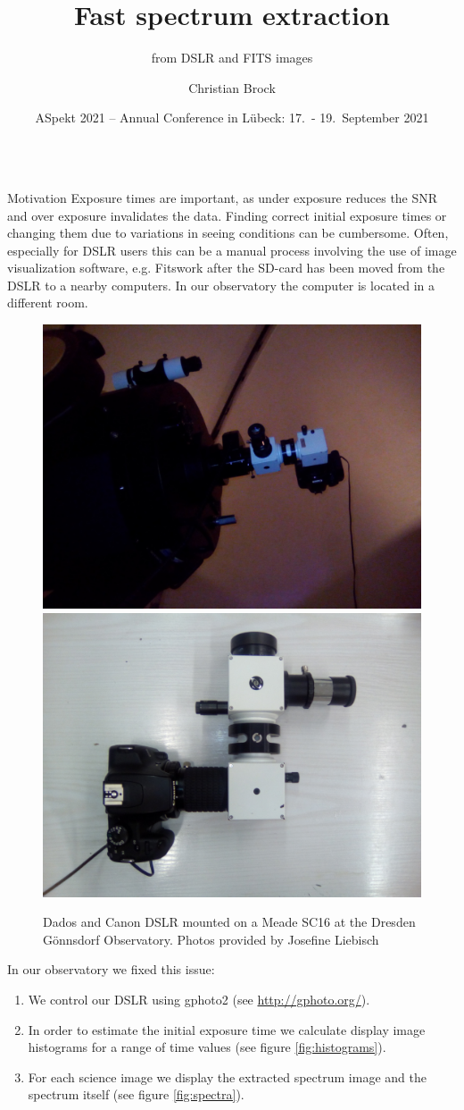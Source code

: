 \documentclass[final,t]{beamer}
\title[]{Fast spectrum extraction}
\subtitle{from DSLR and FITS images}
\author[]{Christian Brock}
\institute[]{Dresden Gönnsdorf Observatory}
\date{ASpekt 2021 -- Annual Conference in Lübeck: 17.\ - 19.\ September 2021}
\begin{document}
	
	\begin{frame}
		\maketitle
		
		\begin{columns}[t]
			\begin{column}{.32\linewidth}
				
				\begin{block}{Motivation}
					Exposure times are important, as under exposure reduces the SNR and over exposure invalidates the data.
			Finding correct initial exposure times or changing them due to variations in seeing conditions can be cumbersome.
			Often, especially for DSLR users this can be a manual process involving the use of image visualization software, e.g. Fitswork after the SD-card has been moved from the DSLR to a nearby computers. In our observatory the computer is located in a different room.
			
			\begin{figure}
				\includegraphics[width=0.49\columnwidth]{img/dados_nacht.jpg}
				\includegraphics[width=0.49\columnwidth]{img/dados_tag.jpg}
				
				\caption[orig]%
				{Dados and Canon DSLR mounted on a Meade SC16 at the Dresden Gönnsdorf Observatory. Photos provided by Josefine Liebisch}
			\end{figure}
			
			In our observatory we fixed this issue:
			\begin{enumerate}
				\item We control our DSLR using gphoto2 (see \url{http://gphoto.org/}).
				\item In order to estimate the initial exposure time we calculate display image histograms for a range of time values (see figure \ref{fig:histograms}).
				\item For each science image we display the extracted spectrum image and the spectrum itself (see figure \ref{fig:spectra}).
			\end{enumerate}
			\textbf{}
			

\end{block}
\end{column}
\end{columns}
\end{frame}
\end{document}
